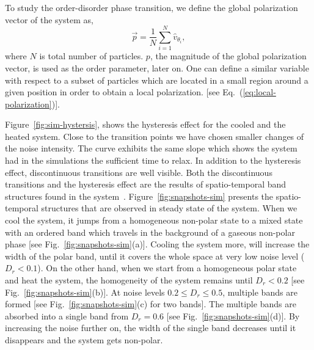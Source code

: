 \documentclass[reprint,floatfix,amsmath,amssymb,aps,pre,showkeys,showpacs,superscriptaddress]{revtex4-1}
\newcommand{\p}{p}
\newcommand{\vp}{\vec{\p}}
\newcommand{\req}[1]{Eq.~(\ref{#1})}
\begin{document}
To study the order-disorder phase transition, we define the global polarization vector of the system as,
\begin{equation}
\vp = \frac{1}{N} \sum_{i=1}^N \hat{v}_{\theta_i},
\label{eq:polarization}
\end{equation}
where $N$ is total number of particles. $\p$, the magnitude of the global polarization vector, is used as the order parameter, later on. One can define a similar variable with respect to a subset of particles which are located in a small region around a given position in order to obtain a local polarization. [see \req{eq:local-polarization}].

Figure~\ref{fig:sim-hystersis}, shows the hysteresis effect for the cooled and the heated system. Close to the transition points we have chosen smaller changes of the noise intensity. The curve exhibits the same slope which shows the system had in the simulations the sufficient time to relax. In addition to the hysteresis effect, discontinuous transitions are well visible. Both the discontinuous transitions and the hysteresis effect are the results of spatio-temporal band structures found in the system~\cite{Gregoire2004,nagy2007,Chate2008,Chate2008a,Ihle2013invasion,solon2015from,solon2015flocking,solon2015pattern,thuroff2014numerical}. Figure~\ref{fig:snapshots-sim} presents the spatio-temporal structures that are observed in steady state of the system. When we cool the system, it jumps from a homogeneous non-polar state to a mixed state with an ordered band which travels in the background of a gaseous non-polar phase [see Fig.~\ref{fig:snapshots-sim}(a)]. Cooling the system more, will increase the width of the polar band, until it covers the whole space at very low noise level ($D_r < 0.1$). On the other hand, when we start from a homogeneous polar state and heat the system, the homogeneity of the system remains until $D_r<0.2$ [see Fig.~\ref{fig:snapshots-sim}(b)]. At noise levels $0.2 \leq D_r \leq 0.5$, multiple bands are formed [see Fig.~\ref{fig:snapshots-sim}(c) for two bands]. The multiple bands are absorbed into a single band from $D_r=0.6$ [see Fig.~\ref{fig:snapshots-sim}(d)]. By increasing the noise further on, the width of the single band decreases until it disappears and the system gets non-polar.
\end{document}

